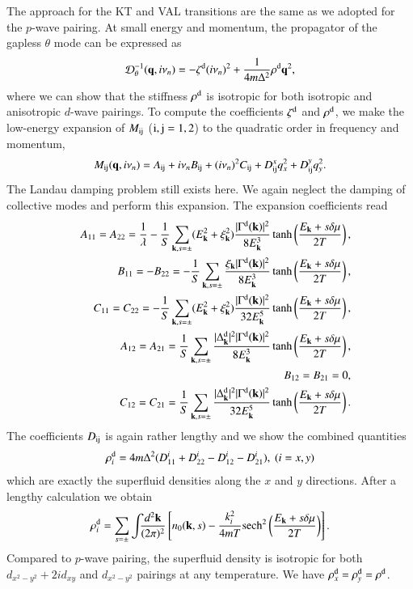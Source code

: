 \documentclass[aps,prd,amsmath,two column,nofootinbib,amssymb,referee]{revtex4}
\begin{document}
The approach for the KT and VAL transitions are the same as we adopted for the $p$-wave pairing. At small energy and momentum, 
the propagator of the gapless $\theta$ mode can be expressed as
\begin{eqnarray}\label{GM-EXP-D}
{\cal D}_\theta^{-1}({\bf q},i\nu_n)=-\zeta^{\rm d}(i\nu_n)^2+{1\over 4m\Delta^2}\rho^{\rm d}{\bf q}^2,
\end{eqnarray}
where we can show that the stiffness $\rho^{\rm d}$ is isotropic for both isotropic and anisotropic $d$-wave pairings.
To compute the coefficients $\zeta^{\rm d}$ and $\rho^{\rm d}$, we make the low-energy expansion of $M_{\rm ij}$ (${\rm i,j}=1,2$) to the quadratic order in frequency and momentum, 
\begin{eqnarray}
M_{\rm ij}({\bf q},i\nu_n)=A_{\rm ij}+i\nu_nB_{\rm ij}+(i\nu_n)^2C_{\rm ij}+D_{\rm ij}^xq_x^2+D_{\rm ij}^yq_y^2.
\end{eqnarray}
The Landau damping problem still exists here.  We again neglect the damping of collective modes and perform this expansion. 
The expansion coefficients read
\begin{eqnarray}\label{ABCd}
&&A_{11}=A_{22}={1\over\lambda}-{1\over S}\sum_{{\bf k},s=\pm}(E_{\bf k}^2+\xi_{\bf k}^2){|\Gamma^{\rm d}({\bf k})|^2\over8E_{\bf k}^3}\tanh\left({E_{\bf k}+s\delta\mu\over2T}\right),\nonumber\\
&&B_{11}=-B_{22}=-{1\over S}\sum_{{\bf k},s=\pm}{\xi_{\bf k}|\Gamma^{\rm d}({\bf k})|^2\over8E_{\bf k}^3}\tanh\left({E_{\bf k}+s\delta\mu\over2T}\right),\nonumber\\
&&C_{11}=C_{22}=-{1\over S}\sum_{{\bf k},s=\pm}(E_{\bf k}^2+\xi_{\bf k}^2){|\Gamma^{\rm d}({\bf k})|^2\over32E_{\bf k}^5}\tanh\left({E_{\bf k}+s\delta\mu\over2T}\right),\nonumber\\
&&A_{12}=A_{21}={1\over S}\sum_{{\bf k},s=\pm}{|\Delta_{\bf k}^{\rm d}|^2|\Gamma^{\rm d}({\bf k})|^2\over8E_{\bf k}^3}\tanh\left({E_{\bf k}+s\delta\mu\over2T}\right),\nonumber\\
&&B_{12}=B_{21}=0,\nonumber\\
&&C_{12}=C_{21}={1\over S}\sum_{{\bf k},s=\pm}{|\Delta_{\bf k}^{\rm d}|^2|\Gamma^{\rm d}({\bf k})|^2\over32E_{\bf k}^5}\tanh\left({E_{\bf k}+s\delta\mu\over2T}\right).
\end{eqnarray}
The coefficients $D_{\rm ij}$ is again rather lengthy and we show the combined quantities 
\begin{eqnarray}
\rho_i^{\rm d}=4m\Delta^2(D_{11}^i+D_{22}^i-D_{12}^i-D_{21}^i), \ (i=x,y)
\end{eqnarray}
which are exactly the superfluid densities along the $x$ and $y$ directions. After a lengthy calculation we obtain
\begin{eqnarray}\label{rhod}
\rho_i^{\rm d}=\sum_{s=\pm}\int\!\!\! {d^2{\bf k}\over(2\pi)^2}\left[n_0({\bf k},s)-\frac{k_i^2}{4mT}{\rm sech}^2\left({E_{\bf k}+s\delta\mu\over2T}\right)\right].
\end{eqnarray}
Compared to $p$-wave pairing, the superfluid density is isotropic for both $d_{x^2-y^2}+2id_{xy}$ and $d_{x^2-y^2}$ pairings at any temperature. We have $\rho_x^{\rm d}=\rho_y^{\rm d}=\rho^{\rm d}$.
\end{document}
